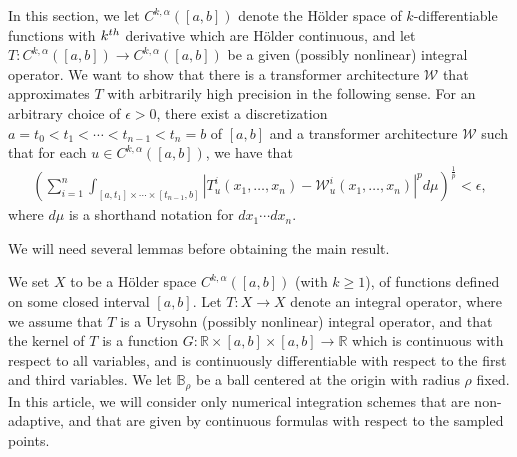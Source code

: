 \documentclass[a4paper,12pt,reqno]{amsart}
\theoremstyle{definition}
\theoremstyle{remark}
\begin{document}
In this section, we let $C^{k,\alpha}([a,b])$ denote the H\"older space of $k$-differentiable functions with $k^{\rm th}$ derivative which are H\"older continuous, and let $T: C^{k,\alpha}([a,b]) \longrightarrow C^{k,\alpha}([a,b])$ be a given (possibly nonlinear) integral operator. We want to show that there is a transformer architecture $\mathcal W$ that approximates $T$ with arbitrarily high precision in the following sense. For an arbitrary choice of $\epsilon >0$, there exist a discretization $a = t_0 < t_1 < \cdots < t_{n-1} < t_n = b$ of $[a,b]$ and a transformer architecture $\mathcal W$ such that for each $u\in C^{k,\alpha}([a,b])$, we have that 
\begin{eqnarray}
    \left (\sum_{i=1}^n \int_{[a,t_1]\times \cdots \times [t_{n-1},b]}|T^i_u(x_1,\ldots,x_n)-\mathcal W^i_u(x_1,\ldots,x_n)|^pd\mu\right )^\frac{1}{p} < \epsilon, 
\end{eqnarray}
where $d\mu$ is a shorthand notation for $dx_1\cdots dx_n$. 

We will need several lemmas before obtaining the main result. 

We set $X$ to be a H\"older space $C^{k,\alpha}([a,b])$ (with $k\geq 1$), of functions defined on some closed interval $[a,b]$. Let $T: X \longrightarrow X$ denote an integral operator, where we assume that $T$ is a Urysohn (possibly nonlinear) integral operator, and that the kernel of $T$ is a function $G: \mathbb R\times [a,b]\times [a,b] \longrightarrow \mathbb R$ which is continuous with respect to all variables, and is continuously differentiable with respect to the first and third variables. We let $\mathbb B_\rho$ be a ball centered at the origin with radius $\rho$ fixed. In this article, we will consider only numerical integration schemes that are non-adaptive, and that are given by continuous formulas with respect to the sampled points. 
\end{document}

